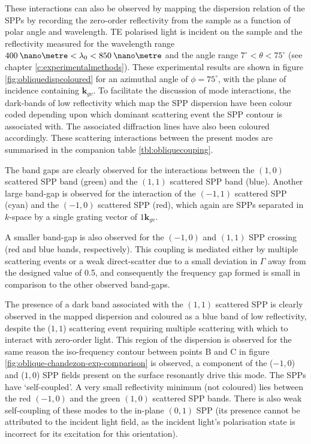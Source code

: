 These interactions can also be observed by mapping the dispersion relation of the SPPs by recording the zero-order reflectivity from the sample as a function of polar angle and wavelength. TE polarised light is incident on the sample and the reflectivity measured for the wavelength range ${400 \:\nano\metre < \lambda_0 < 850 \:\nano\metre}$ and the angle range ${7^\circ<\theta<75^\circ}$ (see chapter \ref{c:experimentalmethods}). These experimental results are shown in figure \ref{fig:obliquedispcoloured} for an azimuthal angle of $\phi=75^\circ$, with the plane of incidence containing $\mathbf{k}_{gv}$. To facilitate the discussion of mode interactions, the dark-bands of low reflectivity which map the SPP dispersion have been colour coded depending upon which dominant scattering event the SPP contour is associated with. The associated diffraction lines have also been coloured accordingly. These scattering interactions between the present modes are summarised in the companion table \ref{tbl:obliquecouping}. 

The band gaps are clearly observed for the interactions between the $(1,0)$ scattered SPP band (green) and the $(1,1)$ scattered SPP band (blue). Another large band-gap is observed for the interaction of the $(-1,1)$ scattered SPP (cyan) and the $(-1,0)$ scattered SPP (red), which again are SPPs separated in $k$-space by a single grating vector of $1\mathbf{k}_{gv}$.

A smaller band-gap is also observed for the $(-1,0)$ and $(1,1)$ SPP crossing (red and blue bands, respectively). This coupling is mediated either by multiple scattering events or a weak direct-scatter due to a small deviation in $\Gamma$ away from the designed value of 0.5, and consequently the frequency gap formed is small in comparison to the other observed band-gaps.

The presence of a dark band associated with the $(1,1)$ scattered SPP is clearly observed in the mapped dispersion and coloured as a blue band of low reflectivity, despite the ($1,1$) scattering event requiring multiple scattering with which to interact with zero-order light. This region of the dispersion is observed for the same reason the iso-frequency contour between points B and C in figure \ref{fig:oblique-chandezon-exp-comparison} is observed, a component of the ($-1,0$) and ($1,0$) SPP fields present on the surface resonantly drive this mode. The SPPs have `self-coupled'. A very small reflectivity minimum (not coloured) lies between the red $(-1,0)$ and the green $(1,0)$ scattered SPP bands. There is also weak self-coupling of these modes to the in-plane $(0,1)$ SPP (its presence cannot be attributed to the incident light field, as the incident light's polarisation state is incorrect for its excitation for this orientation).


